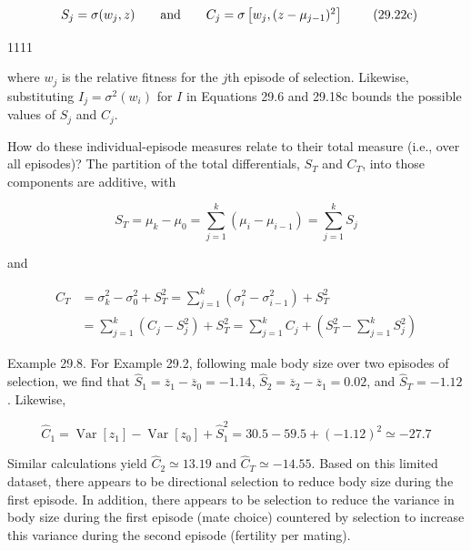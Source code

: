 \documentclass{article}
\begin{document}
\begin{equation}
\begin{array}{r l r}{S_{j}=\sigma(w_{j},z)}&{{}\quad\mathrm{a n d}\quad}&{C_{j}=\sigma\left[w_{j},(z-\mu_{j-1})^{2}\right]}\end{array}
\tag{29.22c}
\label{eq:29_22c}
\end{equation}

1111

where  $ w_j $ is the relative fitness for the  $ j $th episode of selection. Likewise, substituting  $ I_j = \sigma^2(w_i) $ for  $ I $ in Equations 29.6 and 29.18c bounds the possible values of  $ S_j $ and  $ C_j $.

How do these individual-episode measures relate to their total measure (i.e., over all episodes)? The partition of the total differentials,  $ S_{T} $ and  $ C_{T} $, into those components are additive, with

\begin{equation}
S_{T}=\mu_{k}-\mu_{0}=\sum_{j=1}^{k}\left(\mu_{i}-\mu_{i-1}\right)=\sum_{j=1}^{k}S_{j}
\tag{29.22d}
\label{eq:29_22d}
\end{equation}

and

\begin{equation}
\begin{aligned}C_{T}&=\sigma_{k}^{2}-\sigma_{0}^{2}+S_{T}^{2}=\sum_{j=1}^{k}\left(\sigma_{i}^{2}-\sigma_{i-1}^{2}\right)+S_{T}^{2}\\&=\sum_{j=1}^{k}\left(C_{j}-S_{j}^{2}\right)+S_{T}^{2}=\sum_{j=1}^{k}C_{j}+\left(S_{T}^{2}-\sum_{j=1}^{k}S_{j}^{2}\right)\end{aligned}
\tag{29.22e}
\label{eq:29_22e}
\end{equation}

Example 29.8. For Example 29.2, following male body size over two episodes of selection, we find that  $ \widehat{S}_1 = \overline{z}_1 - \overline{z}_0 = -1.14 $,  $ \widehat{S}_2 = \overline{z}_2 - \overline{z}_1 = 0.02 $, and  $ \widehat{S}_T = -1.12 $. Likewise,

\begin{equation}
\widehat{C}_{1}=\operatorname{Var}[z_{1}]-\operatorname{Var}[z_{0}]+\widehat{S}_{1}^{2}=30.5-59.5+\left(-1.12\right)^{2}\simeq-27.7
\end{equation}

Similar calculations yield  $ \hat{C}_2 \simeq 13.19 $ and  $ \hat{C}_T \simeq -14.55 $. Based on this limited dataset, there appears to be directional selection to reduce body size during the first episode. In addition, there appears to be selection to reduce the variance in body size during the first episode (mate choice) countered by selection to increase this variance during the second episode (fertility per mating).
\end{document}
